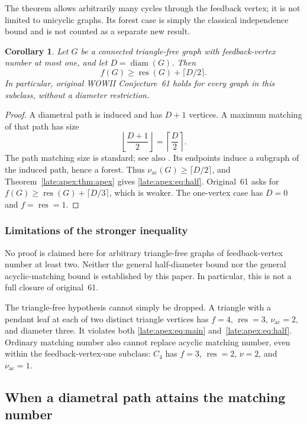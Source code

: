 \documentclass[11pt,a4paper]{article}
\newtheorem{corollary}[theorem]{Corollary}
\theoremstyle{definition}\newtheorem{definition}[theorem]{Definition}
\theoremstyle{remark}\newtheorem{remark}[theorem]{Remark}
\newcommand{\res}{\operatorname{res}}
\begin{document}
The theorem allows arbitrarily many cycles through the feedback vertex;
it is not limited to unicyclic graphs. Its forest case is simply the
classical independence bound and is not counted as a separate new result.

\begin{corollary}\label{late:apex:cor:diameter}
Let $G$ be a connected triangle-free graph with feedback-vertex number
at most one, and let $D=\operatorname{diam}(G)$. Then
\begin{equation}\label{late:apex:eq:half}
 f(G)\ge\res(G)+\lceil D/2\rceil.
\end{equation}
In particular, original WOWII Conjecture~61 holds for every graph in
this subclass, without a diameter restriction.
\end{corollary}
\begin{proof}
A diametral path is induced and has $D+1$ vertices. A maximum matching
of that path has size
\[
 \left\lfloor\frac{D+1}{2}\right\rfloor
 =\left\lceil\frac D2\right\rceil.
\]
The path matching size is standard; see also \cite[Theorem~3]{late:apex:GHHL}.
Its endpoints induce a subgraph of the induced path, hence a forest.
Thus $\nu_{\mathrm{ac}}(G)\ge\lceil D/2\rceil$, and Theorem~\ref{late:apex:thm:apex} gives
\eqref{late:apex:eq:half}. Original~61 asks for
$f(G)\ge\res(G)+\lceil D/3\rceil$, which is weaker. The one-vertex
case has $D=0$ and $f=\res=1$.
\end{proof}

\subsubsection{Limitations of the stronger inequality}
No proof is claimed here for arbitrary triangle-free graphs of
feedback-vertex number at least two. Neither the general half-diameter
bound nor the general acyclic-matching bound is established by this
paper. In particular, this is not a full closure of original~61.

The triangle-free hypothesis cannot simply be dropped. A triangle with
a pendant leaf at each of two distinct triangle vertices has
$f=4$, $\res=3$, $\nu_{\mathrm{ac}}=2$, and diameter three. It violates both
\eqref{late:apex:eq:main} and~\eqref{late:apex:eq:half}. Ordinary matching number also cannot
replace acyclic matching number, even within the feedback-vertex-one
subclass: $C_4$ has $f=3$, $\res=2$, $\nu=2$, and $\nu_{\mathrm{ac}}=1$.


\subsection{When a diametral path attains the matching number}\label{late:geodesic}
\end{document}
